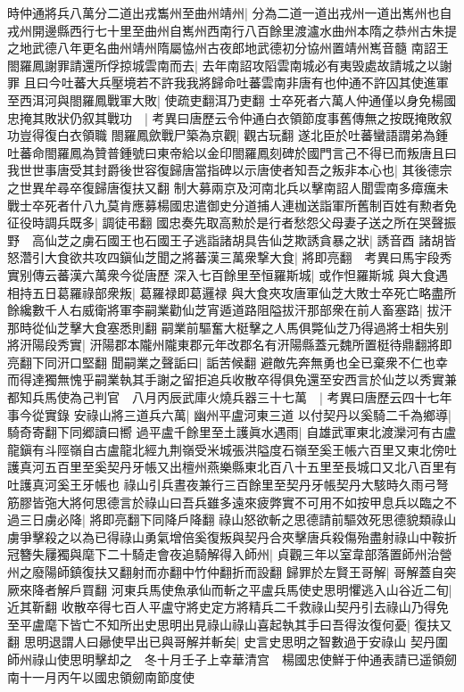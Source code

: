 時仲通將兵八萬分二道出戎雟州至曲州靖州|{
	分為二道一道出戎州一道出嶲州也自戎州開邊縣西行七十里至曲州自嶲州西南行八百餘里渡瀘水曲州本隋之恭州古朱提之地武德八年更名曲州靖州隋屬恊州古夜郎地武德初分協州置靖州嶲音髓}
南詔王閤羅鳳謝罪請還所俘掠城雲南而去|{
	去年南詔攻䧟雲南城必有夷毁處故請城之以謝罪}
且曰今吐蕃大兵壓境若不許我我將歸命吐蕃雲南非唐有也仲通不許囚其使進軍至西洱河與閤羅鳳戰軍大敗|{
	使疏吏翻洱乃吏翻}
士卒死者六萬人仲通僅以身免楊國忠掩其敗狀仍叙其戰功　|{
	考異曰唐歷云令仲通白衣領節度事舊傳無之按既掩敗叙功豈得復白衣領職}
閤羅鳳歛戰尸築為京觀|{
	觀古玩翻}
遂北臣於吐蕃蠻語謂弟為鍾吐蕃命閤羅鳳為贊普鍾號曰東帝給以金印閤羅鳳刻碑於國門言己不得已而叛唐且曰我世世事唐受其封爵後世容復歸唐當指碑以示唐使者知吾之叛非本心也|{
	其後德宗之世異牟尋卒復歸唐復扶又翻}
制大募兩京及河南北兵以擊南詔人聞雲南多瘴癘未戰士卒死者什八九莫肯應募楊國忠遣御史分道捕人連枷送詣軍所舊制百姓有勲者免征役時調兵既多|{
	調徒弔翻}
國忠奏先取高勲於是行者愁怨父母妻子送之所在哭聲振野　高仙芝之虜石國王也石國王子逃詣諸胡具告仙芝欺誘貪暴之狀|{
	誘音酉}
諸胡皆怒濳引大食欲共攻四鎭仙芝聞之將蕃漢三萬衆撃大食|{
	將即亮翻　考異曰馬宇段秀實别傳云蕃漢六萬衆今從唐歷}
深入七百餘里至恒羅斯城|{
	或作怛羅斯城}
與大食遇相持五日葛羅祿部衆叛|{
	葛羅禄即葛邏禄}
與大食夾攻唐軍仙芝大敗士卒死亡略盡所餘纔數千人右威衛將軍李嗣業勸仙芝宵遁道路阻隘拔汗那部衆在前人畜塞路|{
	拔汗那時從仙芝擊大食塞悉則翻}
嗣業前驅奮大梃擊之人馬俱斃仙芝乃得過將士相失别將汧陽段秀實|{
	汧陽郡本隴州隴東郡元年改郡名有汧陽縣蓋元魏所置梃待鼎翻將即亮翻下同汧口堅翻}
聞嗣業之聲詬曰|{
	詬苦候翻}
避敵先奔無勇也全已棄衆不仁也幸而得達獨無愧乎嗣業執其手謝之留拒追兵收散卒得俱免還至安西言於仙芝以秀實兼都知兵馬使為己判官　八月丙辰武庫火燒兵器三十七萬　|{
	考異曰唐歷云四十七年事今從實錄}
安祿山將三道兵六萬|{
	幽州平盧河東三道}
以付契丹以奚騎二千為鄉導|{
	騎奇寄翻下同郷讀曰嚮}
過平盧千餘里至土護眞水遇雨|{
	自雄武軍東北渡灤河有古盧龍鎭有斗陘嶺自古盧龍北經九荆嶺受米城張洪隘度石嶺至奚王帳六百里又東北傍吐護真河五百里至奚契丹牙帳又出檀州燕樂縣東北百八十五里至長城口又北八百里有吐護真河奚王牙帳也}
祿山引兵晝夜兼行三百餘里至契丹牙帳契丹大駭時久雨弓弩筋膠皆㢮大將何思德言於祿山曰吾兵雖多遠來疲弊實不可用不如按甲息兵以臨之不過三日虜必降|{
	將即亮翻下同降戶降翻}
祿山怒欲斬之思德請前驅效死思德貌類祿山虜爭擊殺之以為已得祿山勇氣增倍奚復叛與契丹合夾擊唐兵殺傷殆盡射祿山中鞍折冠簪失屨獨與麾下二十騎走會夜追騎解得入師州|{
	貞觀三年以室韋部落置師州治營州之廢陽師鎮復扶又翻射而亦翻中竹仲翻折而設翻}
歸罪於左賢王哥解|{
	哥解蓋自突厥來降者解戶買翻}
河東兵馬使魚承仙而斬之平盧兵馬使史思明懼逃入山谷近二旬|{
	近其靳翻}
收散卒得七百人平盧守將史定方將精兵二千救祿山契丹引去祿山乃得免至平盧麾下皆亡不知所出史思明出見祿山祿山喜起執其手曰吾得汝復何憂|{
	復扶又翻}
思明退謂人曰曏使早出已與哥解并斬矣|{
	史言史思明之智數過于安祿山}
契丹圍師州祿山使思明擊却之　冬十月壬子上幸華清宫　楊國忠使鮮于仲通表請已遥領劒南十一月丙午以國忠領劒南節度使

